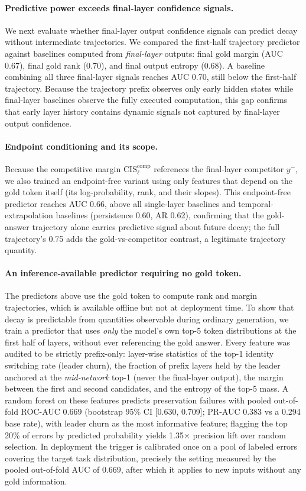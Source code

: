 \documentclass{article} %
\begin{document}
\paragraph{Predictive power exceeds final-layer confidence signals.}
We next evaluate whether final-layer output confidence signals can predict decay without intermediate trajectories. We compared the first-half trajectory predictor against baselines computed from \emph{final-layer} outputs: final gold margin (AUC 0.67), final gold rank (0.70), and final output entropy (0.68). A baseline combining all three final-layer signals reaches AUC 0.70, still below the first-half trajectory. Because the trajectory prefix observes only early hidden states while final-layer baselines observe the fully executed computation, this gap confirms that early layer history contains dynamic signals not captured by final-layer output confidence.

\paragraph{Endpoint conditioning and its scope.}
Because the competitive margin $\mathrm{CIS}^{\mathrm{comp}}_\ell$ references the final-layer competitor $y^-$, we also trained an endpoint-free variant using only features that depend on the gold token itself (its log-probability, rank, and their slopes). This endpoint-free predictor reaches AUC 0.66, above all single-layer baselines and temporal-extrapolation baselines (persistence 0.60, AR 0.62), confirming that the gold-answer trajectory alone carries predictive signal about future decay; the full trajectory's 0.75 adds the gold-vs-competitor contrast, a legitimate trajectory quantity.

\paragraph{An inference-available predictor requiring no gold token.}
\label{sec:nonoracle}
The predictors above use the gold token to compute rank and margin trajectories, which is available offline but not at deployment time. To show that decay is predictable from quantities observable during ordinary generation, we train a predictor that uses \emph{only} the model's own top-5 token distributions at the first half of layers, without ever referencing the gold answer. Every feature was audited to be strictly prefix-only: layer-wise statistics of the top-1 identity switching rate (leader churn), the fraction of prefix layers held by the leader anchored at the \emph{mid-network} top-1 (never the final-layer output), the margin between the first and second candidates, and the entropy of the top-5 mass. A random forest on these features predicts preservation failures with pooled out-of-fold ROC-AUC 0.669 (bootstrap 95\% CI [0.630, 0.709]; PR-AUC 0.383 vs a 0.294 base rate), with leader churn as the most informative feature; flagging the top 20\% of errors by predicted probability yields 1.35$\times$ precision lift over random selection. In deployment the trigger is calibrated once on a pool of labeled errors covering the target task distribution, precisely the setting measured by the pooled out-of-fold AUC of 0.669, after which it applies to new inputs without any gold information.
\end{document}
